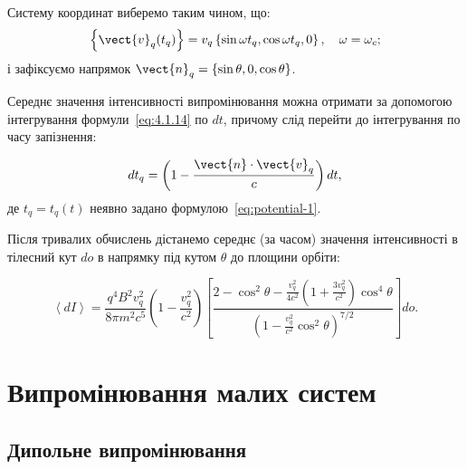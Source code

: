 Систему координат виберемо таким чином, що:
\begin{equation*}
    \left\{\vect{v}_q(t_q)\right\} = v_q\left\{ \sin\omega t_q, \cos\omega t_q, 0\right\}, \quad \omega = \omega_c;
\end{equation*}
і зафіксуємо напрямок \( \vect{n}_q = \{\sin \theta, 0, \cos \theta\} \).

Середнє значення інтенсивності випромінювання можна отримати за допомогою інтегрування формули~\eqref{eq:4.1.14} по \(
dt \), причому слід перейти до інтегрування по часу запізнення:

\begin{equation*}
	dt_q = \left(1 - \frac{\vect{n}\cdot\vect{v}_q}{c}\right)dt,
\end{equation*}
де \( t_q = t_q(t) \) неявно задано формулою~\eqref{eq:potential-1}.

Після тривалих обчислень дістанемо середнє (за часом) значення інтенсивності в тілесний кут \( do \) в напрямку під
кутом \( \theta \) до площини орбіти:


\begin{equation*}
	\left\langle dI \right\rangle  = \frac{q^4 B^2 v^2_q}{8\pi m^2c^5}\left( 1 - \frac{v_q^2}{c^2}\right)  \left[
		\frac{2-\cos^2\theta - \frac{v_q^2}{4c^2}\left( 1 + \frac{3v_q^2}{c^2}\right)\cos^4\theta  }{ \left( 1- \frac{v_q^2}{c^2}\cos^2\theta\right)^{7/2} }
		\right] do.
\end{equation*}


\section{Випромінювання малих систем}

\subsection*{Дипольне випромінювання}

